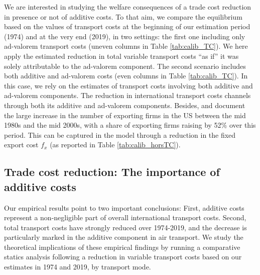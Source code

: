 \documentclass[a4paper,11pt]{article}
\begin{document}
We are interested in studying the welfare consequences of a trade cost reduction in presence or not of additive costs. To that aim, we compare the equilibrium based on the values of transport costs at the beginning of our estimation period (1974) and at the very end (2019), in two settings: the first one including only ad-valorem transport costs (uneven columns in Table \ref{tab:calib_TC}). We here apply the estimated reduction in total variable transport costs ``as if'' it was solely attributable to the ad-valorem component. The second scenario includes both additive and ad-valorem costs (even columns in Table \ref{tab:calib_TC}). In this case, we rely on the estimates of transport costs involving both additive and ad-valorem components. The reduction in international transport costs channels through both its additive and ad-valorem components. Besides, \cite{BEJK-AER-03} and \cite{Lincoln_McCallum2018} document the large increase in the number of exporting firms in the US between the mid 1980s and the mid 2000s, with a share of exporting firms raising by 52\% over this period. This can be captured in the model through a reduction in the fixed export cost $f_x$ (as reported in Table \ref{tab:calib_horsTC}).



\subsection{Trade cost reduction: The importance of additive costs}

Our empirical results point to two important conclusions: First, additive costs represent a non-negligible part of overall international transport costs. Second, total transport costs have strongly reduced over 1974-2019, and the decrease is particularly marked in the additive component in air transport. We study the theoretical implications of these empirical findings by running a comparative statics analysis following a reduction in variable transport costs based on our estimates in 1974 and 2019, by transport mode.
\end{document}
